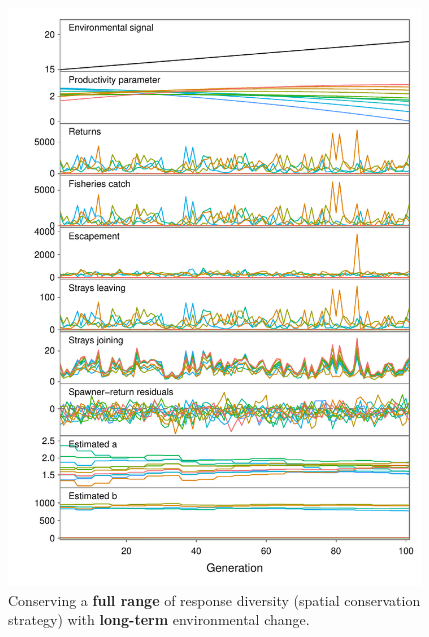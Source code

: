 \begin{figure}[htbp]
\centering
\includegraphics[width=4.3in]{metafolio/spatial-linear-sim-full}
\caption{Conserving a \textbf{full range} of response diversity (spatial
conservation strategy) with \textbf{long-term} environmental change.}
\label{f:eg-sp-linear-full}
\end{figure}

\clearpage

